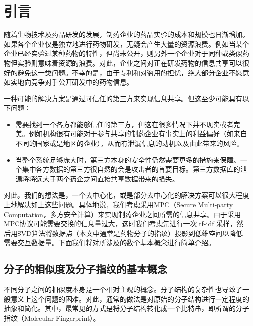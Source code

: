 \chapter{引言}
\label{cha:intro}

随着生物技术及药品研发的发展，制药企业的药品实验的成本和规模也日渐增加。如果各个企业仅是独立地进行药物研发，无疑会产生大量的资源浪费。例如当某个企业已经实验过某种药物的特性，但尚未公开，则另外一个企业对于同种或类似药物但实验则意味着资源的浪费。对此，企业之间对正在研发药物的信息共享可以很好的避免这一类问题。不幸的是，由于专利和对盗用的担忧，绝大部分企业不愿意如实地向竞争对手公开研发中的药物信息。

一种可能的解决方案是通过可信任的第三方来实现信息共享。但这至少可能具有以下问题：
\begin{itemize}
	\item 需要找到一个各方都能够信任的第三方，但这在很多情况下并不现实或者完美。例如机构很有可能对于参与共享的制药企业有事实上的利益偏好（如来自不同的国家或是地区的企业），从而有泄漏信息的动机以及由此带来的风险。
	\item 当整个系统足够庞大时，第三方本身的安全性仍然需要更多的措施来保障。一个集中各方数据的第三方很自然的会是攻击者的首要目标。第三方数据库的泄漏将将远大于两个药企之间直接共享数据带来的损失。
\end{itemize}

对此，我们的想法是，一个去中心化，或是部分去中心化的解决方案可以很大程度上地解决如上这些问题。具体地说，我们考虑采用MPC（Secure Multi-party Computation，多方安全计算）来实现制药企业之间所需的信息共享。由于采用MPC协议可能需要交换的信息量过大，这时我们考虑先进行一次 tf-idf 采样，然后用SVD算法将数据点（本文中通常是药物分子的指纹）投影到低维空间以降低需要交互数据量。下面我们将对所涉及的数个基本概念进行简单介绍。

\section{分子的相似度及分子指纹的基本概念}

不同分子之间的相似度本身是一个相对主观的概念。分子结构的复杂性也导致了一般意义上这个问题的困难。对此，通常的做法是对原始的分子结构进行一定程度的抽象和简化。其中，最常见的方式是将分子结构转化成一个比特串，即所谓的分子指纹（Molecular Fingerprint）。

